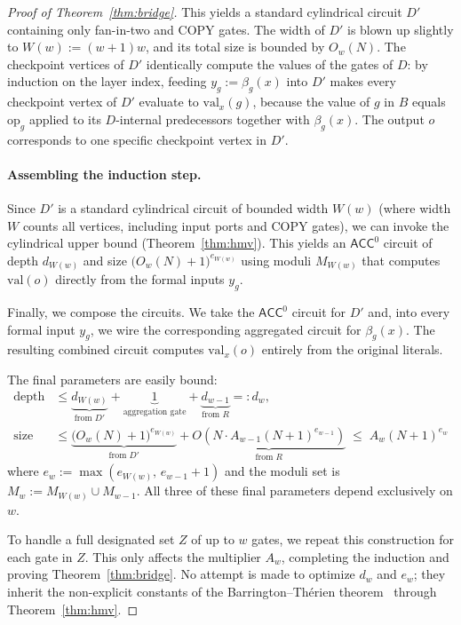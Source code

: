 \documentclass[11pt]{article}
\theoremstyle{definition}
\theoremstyle{remark}
\newcommand{\ACC}{\mathsf{ACC}^0}
\begin{document}
\begin{proof}[Proof of Theorem~\ref{thm:bridge}]
This yields a standard cylindrical circuit $D'$ containing only fan-in-two and $\mathrm{COPY}$ gates. The width of $D'$ is blown up slightly to $W(w) := (w+1)w$, and its total size is bounded by $O_w(N)$. The checkpoint vertices of $D'$ identically compute the values of the gates of $D$: by induction on the layer index, feeding $y_g := \beta_g(x)$ into $D'$ makes every checkpoint vertex of $D'$ evaluate to $\mathrm{val}_x(g)$, because the value of $g$ in $B$ equals $\mathrm{op}_g$ applied to its $D$-internal predecessors together with $\beta_g(x)$. The output $o$ corresponds to one specific checkpoint vertex in $D'$.

\paragraph{Assembling the induction step.}

Since $D'$ is a standard cylindrical circuit of bounded width $W(w)$ (where width $W$ counts all vertices, including input ports and $\mathrm{COPY}$ gates), we can invoke the cylindrical upper bound (Theorem~\ref{thm:hmv}). This yields an $\ACC$ circuit of depth $d_{W(w)}$ and size $\bigl(O_w(N)+1\bigr)^{e_{W(w)}}$ using moduli $M_{W(w)}$ that computes $\mathrm{val}(o)$ directly from the formal inputs $y_g$.

Finally, we compose the circuits. We take the $\ACC$ circuit for $D'$ and, into every formal input $y_g$, we wire the corresponding aggregated circuit for $\beta_g(x)$. The resulting combined circuit computes $\mathrm{val}_x(o)$ entirely from the original literals.

The final parameters are easily bound:
\begin{align*}
\mathrm{depth} &\le \underbrace{d_{W(w)}}_{\text{from } D'} + \underbrace{1}_{\text{aggregation gate}} + \underbrace{d_{w-1}}_{\text{from } R} =: d_w,\\
\mathrm{size} &\le \underbrace{\bigl(O_w(N)+1\bigr)^{e_{W(w)}}}_{\text{from } D'}
 + \underbrace{O\left(N \cdot A_{w-1}(N+1)^{e_{w-1}}\right)}_{\text{from } R} \;\le\; A_w (N+1)^{e_w}
\end{align*}
where $e_w := \max(e_{W(w)},\, e_{w-1}+1)$ and the moduli set is $M_w := M_{W(w)} \cup M_{w-1}$. All three of these final parameters depend exclusively on $w$.

To handle a full designated set $Z$ of up to $w$ gates, we repeat this construction for each gate in $Z$. This only affects the multiplier $A_w$, completing the induction and proving Theorem~\ref{thm:bridge}. No attempt is made to optimize $d_w$ and $e_w$; they inherit the non-explicit constants of the Barrington--Th\'erien theorem~\cite{BT88} through Theorem~\ref{thm:hmv}.
\end{proof}
\end{document}
